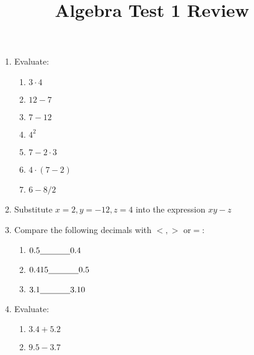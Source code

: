 \documentclass[12pt]{article}
\title{Algebra Test 1 Review}
\newcommand{\blk}{\underline{\hspace{0.5in}}}
\begin{document}
{}
\begin{enumerate}
	\item Evaluate:
	\begin{enumerate}
		\item $3\cdot 4$
		\item $12 - 7$
		\item $7 - 12$
		\item $4^2$
		\item $7-2\cdot 3$
		\item $4\cdot(7-2)$
		\item $6- 8/2$
	\end{enumerate}
	\item Substitute $x=2, y=-12, z=4$ into the expression $xy - z$
	\item Compare the following decimals with $<, >$ or$ =$:
	\begin{enumerate}
		\item $0.5 \blk{} 0.4$
		\item $0.415 \blk 0.5$
		\item $3.1 \blk 3.10$
	\end{enumerate}
	\item Evaluate:
	\begin{enumerate}
		\item $3.4 + 5.2$
		\item $9.5 - 3.7$

\end{enumerate}
\end{enumerate}
\end{document}

